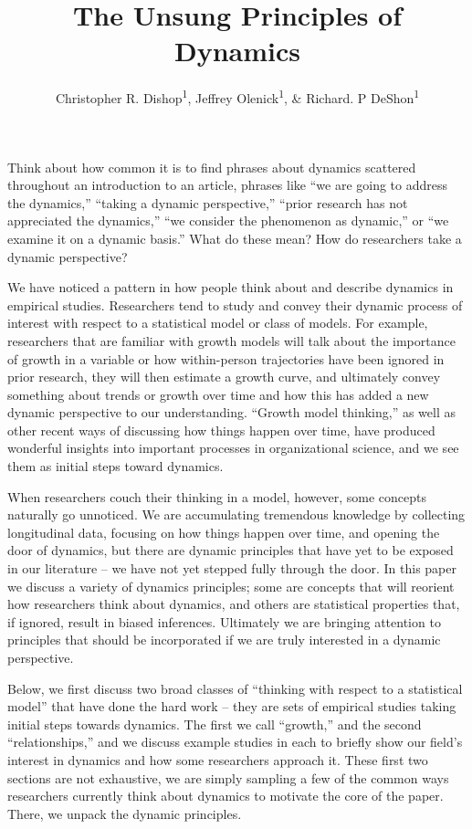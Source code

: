 \documentclass[english,,man]{apa6}
\title{The Unsung Principles of Dynamics}
\author{Christopher R. Dishop\textsuperscript{1}, Jeffrey
Olenick\textsuperscript{1}, \& Richard. P DeShon\textsuperscript{1}}
\date{}
\affiliation{
\vspace{0.5cm}
\textsuperscript{1} Michigan State University}
\theoremstyle{definition}
\theoremstyle{definition}
\theoremstyle{definition}
\theoremstyle{remark}
\begin{document}
\maketitle

Think about how common it is to find phrases about dynamics scattered
throughout an introduction to an article, phrases like \enquote{we are
going to address the dynamics,} \enquote{taking a dynamic perspective,}
\enquote{prior research has not appreciated the dynamics,} \enquote{we
consider the phenomenon as dynamic,} or \enquote{we examine it on a
dynamic basis.} What do these mean? How do researchers take a dynamic
perspective?

We have noticed a pattern in how people think about and describe
dynamics in empirical studies. Researchers tend to study and convey
their dynamic process of interest with respect to a statistical model or
class of models. For example, researchers that are familiar with growth
models will talk about the importance of growth in a variable or how
within-person trajectories have been ignored in prior research, they
will then estimate a growth curve, and ultimately convey something about
trends or growth over time and how this has added a new dynamic
perspective to our understanding. \enquote{Growth model thinking,} as
well as other recent ways of discussing how things happen over time,
have produced wonderful insights into important processes in
organizational science, and we see them as initial steps toward
dynamics.

When researchers couch their thinking in a model, however, some concepts
naturally go unnoticed. We are accumulating tremendous knowledge by
collecting longitudinal data, focusing on how things happen over time,
and opening the door of dynamics, but there are dynamic principles that
have yet to be exposed in our literature -- we have not yet stepped
fully through the door. In this paper we discuss a variety of dynamics
principles; some are concepts that will reorient how researchers think
about dynamics, and others are statistical properties that, if ignored,
result in biased inferences. Ultimately we are bringing attention to
principles that should be incorporated if we are truly interested in a
dynamic perspective.

Below, we first discuss two broad classes of \enquote{thinking with
respect to a statistical model} that have done the hard work -- they are
sets of empirical studies taking initial steps towards dynamics. The
first we call \enquote{growth,} and the second \enquote{relationships,}
and we discuss example studies in each to briefly show our field's
interest in dynamics and how some researchers approach it. These first
two sections are not exhaustive, we are simply sampling a few of the
common ways researchers currently think about dynamics to motivate the
core of the paper. There, we unpack the dynamic principles.
\end{document}
